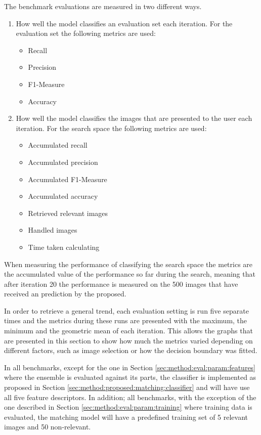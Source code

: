 The benchmark evaluations are measured in two different ways.
\begin{enumerate}
\item How well the model classifies an evaluation set each iteration. For the evaluation set the following metrics are used: 
	\begin{itemize}
		\item Recall
		\item Precision
		\item F1-Measure
		\item Accuracy
	\end{itemize}   
\item How well the model classifies the images that are presented to the user each iteration. For the search space the following metrics are used:
	\begin{itemize}
		\item Accumulated recall 
		\item Accumulated precision
		\item Accumulated F1-Measure
		\item Accumulated accuracy
		\item Retrieved relevant images
		\item Handled images
		\item Time taken calculating
	\end{itemize}   
\end{enumerate}
\medskip
When measuring the performance of classifying the search space the metrics are the accumulated value of the performance so far during the search, meaning that after iteration 20 the performance is measured on the 500 images that have received an prediction by the proposed.

In order to retrieve a general trend, each evaluation setting is run five separate times and the metrics during these runs are presented with the maximum, the minimum and the geometric mean of each iteration. This allows the graphs that are presented in this section to show how much the metrics varied depending on different factors, such as image selection or how the decision boundary was fitted.

In all benchmarks, except for the one in Section \ref{sec:method:eval:param:features} where the ensemble is evaluated against its parts, the classifier is implemented as proposed in Section \ref{sec:method:proposed:matching:classifier} and will have use all five feature descriptors. In addition; all benchmarks, with the exception of the one described in Section \ref{sec:method:eval:param:training} where training data is evaluated, the matching model will have a predefined training set of 5 relevant images and 50 non-relevant.

